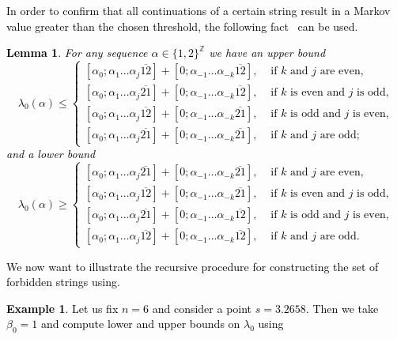 \documentclass[10pt]{amsart}
\newtheorem{lemma}[theorem]{Lemma}
\numberwithin{equation}{section}
\theoremstyle{definition}
\newtheorem{example}[theorem]{Example}
\newcommand\pvlong[1]{\textcolor{black}{#1} }
\begin{document}
\pvlong{In order to confirm that all continuations of a certain string result in a
Markov value greater than the chosen threshold, the following 
fact~\cite[Lemma~2.4]{MMPV} can be used. 
\\
\begin{lemma}
    \label{lem:intlim}
    For any sequence $\alpha \in \{1,2\}^{\mathbb{Z}}$ we have an upper bound
    $$
    \lambda_0(\alpha) \le 
    \begin{cases}
    [\alpha_0; \alpha_1 \dots \alpha_j \overline{12}] + 
    [0;\alpha_{-1} \dots \alpha_{-k} \overline{12}], &\mbox{ if } k \mbox{ and }
    j \mbox{ are even,} \\
    [\alpha_0; \alpha_1 \dots \alpha_j \overline{21}] + 
    [0;\alpha_{-1} \dots \alpha_{-k} \overline{12}], &\mbox{ if } k \mbox{ is
    even and } j \mbox{ is odd,} \\ 
    [\alpha_0; \alpha_1 \dots \alpha_j \overline{12}] + 
    [0;\alpha_{-1} \dots \alpha_{-k} \overline{21}], &\mbox{ if } k \mbox{ is
    odd and } j \mbox{ is even,} \\ 
    [\alpha_0; \alpha_1 \dots \alpha_j \overline{21}] + 
    [0;\alpha_{-1} \dots \alpha_{-k} \overline{21}], &\mbox{ if } k \mbox{ and }
    j \mbox{ are odd;} 
    \end{cases}
    $$
    and a lower bound 
    $$
    \lambda_0(\alpha) \ge 
    \begin{cases}
    [\alpha_0; \alpha_1 \dots \alpha_j \overline{21}] + 
    [0;\alpha_{-1} \dots \alpha_{-k} \overline{21}], &\mbox{ if } k \mbox{ and }
    j \mbox{ are even,} \\
    [\alpha_0; \alpha_1 \dots \alpha_j \overline{12}] + 
    [0;\alpha_{-1} \dots \alpha_{-k} \overline{21}], &\mbox{ if } k \mbox{ is
    even and } j \mbox{ is odd,} \\ 
    [\alpha_0; \alpha_1 \dots \alpha_j \overline{21}] + 
    [0;\alpha_{-1} \dots \alpha_{-k} \overline{12}], &\mbox{ if } k \mbox{ is
    odd and } j \mbox{ is even,} \\ 
    [\alpha_0; \alpha_1 \dots \alpha_j \overline{12}] + 
    [0;\alpha_{-1} \dots \alpha_{-k} \overline{12}], &\mbox{ if } k \mbox{ and }
    j \mbox{ are odd.} 
    \end{cases}
    $$
\end{lemma}
We now want to illustrate the recursive procedure for constructing the set of forbidden
strings using. 
\begin{example}
Let us fix $n=6$ and consider a point $s=3.2658$. Then we take 
$\beta_0 = 1$ and compute lower and upper bounds on $\lambda_0$ using

\end{example}}
\end{document}
